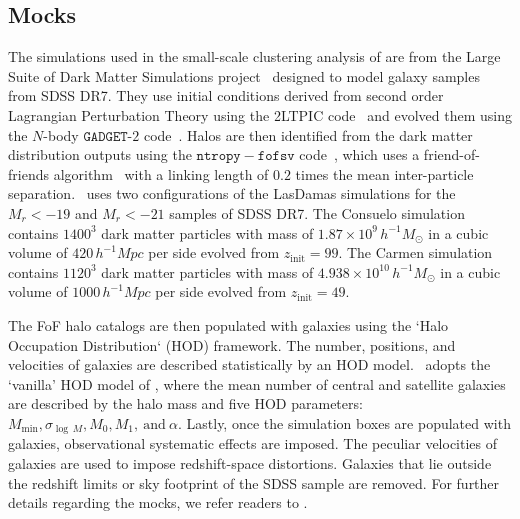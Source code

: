 \documentclass[12pt, letterpaper, preprint]{aastex}
\newcommand{\Sinh}{\citetalias{sinha2017a}}
\begin{document}
\subsection{\cite{sinha2017a} Mocks} \label{sec:gmf} 
The simulations used in the small-scale clustering analysis of \cite{sinha2017a} 
are from the Large Suite of Dark Matter Simulations project~\citep[LasDamas;][]{mcbride2009} 
designed to model galaxy samples from SDSS DR7. They use initial conditions derived from 
second order Lagrangian Perturbation Theory using the 2LTPIC code~\citep{scoccimarro1998, crocce2006}
and evolved them using the $N$-body $\mathtt{GADGET}$-$2$ code~\citep{springel2005}.
Halos are then identified from the dark matter distribution outputs using 
the $\mathtt{ntropy-fofsv}$ code~\citep{gardner2007}, which uses a 
friend-of-friends algorithm~\citep[FoF;][]{davis1985} with a linking length of $0.2$
times the mean inter-particle separation. %
\Sinh~uses two configurations of the LasDamas simulations for the 
$M_r < -19$ and $M_r < -21$ samples of SDSS DR7.
The Consuelo simulation contains $1400^3$ dark matter particles with 
mass of $1.87 \times 10^9\,h^{-1} M_\odot$ in a cubic volume of 
$420\,h^{-1} Mpc$ per side evolved from $z_\mathrm{init} = 99$. 
The Carmen simulation contains $1120^3$ dark matter particles with mass 
of $4.938 \times 10^{10}\,h^{-1} M_\odot$ in a cubic volume of 
$1000\,h^{-1} Mpc$ per side evolved from $z_\mathrm{init} = 49$. 

The FoF halo catalogs are then populated with galaxies using the 
`Halo Occupation Distribution` (HOD) framework. The 
number, positions, and velocities of galaxies are described statistically 
by an HOD model. \Sinh~adopts the `vanilla' HOD model of \cite{zheng2007}, 
where the mean number of central and satellite galaxies are described by 
the halo mass and five HOD parameters: $M_\mathrm{min}, 
\sigma_{\log\,M} , M_0, M_1,~\mathrm{and}~\alpha$. Lastly, once the 
simulation boxes are populated with galaxies, observational systematic 
effects are imposed. The peculiar velocities of galaxies are used to 
impose redshift-space distortions. Galaxies that lie outside the redshift
limits or sky footprint of the SDSS sample are removed. For further 
details regarding the mocks, we refer readers to \Sinh.
\end{document}
